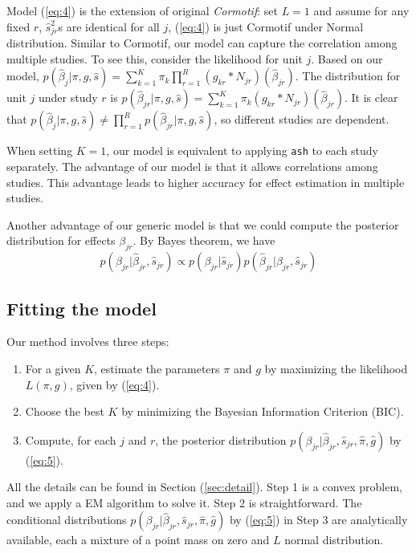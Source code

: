 \documentclass[11pt]{article}
\begin{document}
Model (\ref{eq:4}) is the extension of original  \textit{Cormotif}: set $L=1$ and assume for any fixed $r$, $\hat s_{jr}^2$s are identical for all $j$, (\ref{eq:4}) is just Cormotif under Normal distribution. Similar to Cormotif, our model can capture the correlation among multiple studies. To see this, consider the likelihood for unit $j$. Based on our model, $p(\hat\beta_j|\pi,g,\hat s) = \sum_{k=1}^K\pi_k\prod_{r=1}^R(g_{kr}*N_{jr})(\hat\beta_{jr})$. The distribution for unit $j$ under study $r$ is $p(\hat\beta_{jr}|\pi,g,\hat s) = \sum_{k=1}^K\pi_k(g_{kr}*N_{jr})(\hat\beta_{jr})$. It is clear that $p(\hat\beta_j|\pi,g,\hat s) \neq \prod_{r=1}^Rp(\hat\beta_{jr}|\pi,g,\hat s)$, so different studies are dependent. 

When setting $K =1$, our model is equivalent to applying {\tt ash} \cite{ash} to each study separately. The advantage of our model is that it allows correlations among studies. This advantage leads to higher accuracy for effect estimation in multiple studies. 

Another advantage of our generic model is that we could compute the posterior distribution for effects $\beta_{jr}$. By Bayes theorem, we have
\begin{equation}
    p(\beta_{jr}|\hat\beta_{jr},\hat s_{jr}) \propto p(\beta_{jr}|\hat s_{jr})p(\hat\beta_{jr}|\beta_{jr},\hat s_{jr})
    \label{eq:5}
\end{equation}

\subsection{Fitting the model}

Our method involves three steps:
\begin{enumerate}
    \item For a given $K$, estimate the parameters $\pi$ and $g$ by maximizing the likelihood $L(\pi,g)$, given by (\ref{eq:4}).
    \item Choose the best $K$ by minimizing the Bayesian Information Criterion (BIC).
    \item Compute, for each $j$ and $r$, the posterior distribution $p(\beta_{jr}|\hat\beta_{jr},\hat s_{jr},\hat\pi,\hat g)$ by (\ref{eq:5}).
\end{enumerate}

All the details can be found in Section (\ref{sec:detail}). Step 1 is a convex problem, and we apply a EM algorithm to solve it. Step 2 is straightforward. The conditional distributions $p(\beta_{jr}|\hat\beta_{jr},\hat s_{jr},\hat\pi,\hat g)$ by (\ref{eq:5}) in Step 3 are analytically available, each a mixture of a point mass on zero and $L$ normal distribution. 
\end{document}
